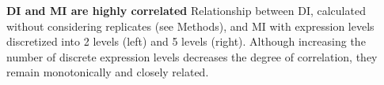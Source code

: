 \textbf{DI and MI are highly correlated}
Relationship between DI, calculated without considering replicates (see Methods), and MI with expression levels discretized into 2 levels (left) and 5 levels (right). Although increasing the number of discrete expression levels decreases the degree of correlation, they remain monotonically and closely related.
